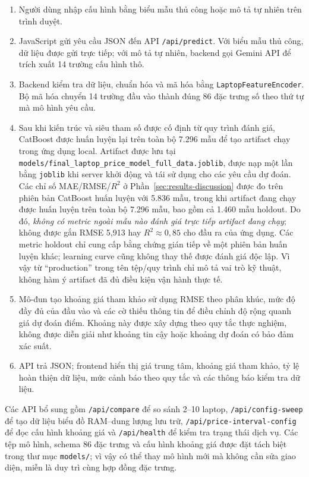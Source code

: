 \begin{enumerate}[label=\arabic*.]
    \item Người dùng nhập cấu hình bằng biểu mẫu thủ công hoặc mô tả tự nhiên trên trình duyệt.
    \item JavaScript gửi yêu cầu JSON đến API \texttt{/api/predict}. Với biểu mẫu thủ công, dữ liệu được gửi trực tiếp; với mô tả tự nhiên, backend gọi Gemini API để trích xuất 14 trường cấu hình thô.
    \item Backend kiểm tra dữ liệu, chuẩn hóa và mã hóa bằng \texttt{LaptopFeatureEncoder}. Bộ mã hóa chuyển 14 trường đầu vào thành đúng 86 đặc trưng số theo thứ tự mà mô hình yêu cầu.
    \item Sau khi kiến trúc và siêu tham số được cố định từ quy trình đánh giá, CatBoost được huấn luyện lại trên toàn bộ 7.296 mẫu để tạo artifact chạy trong ứng dụng local. Artifact được lưu tại \texttt{models/final\_laptop\_price\_model\_full\_data.joblib}, được nạp một lần bằng \texttt{joblib} khi server khởi động và tái sử dụng cho các yêu cầu dự đoán. Các chỉ số MAE/RMSE/$R^2$ ở Phần~\ref{sec:results-discussion} được đo trên phiên bản CatBoost huấn luyện với 5.836 mẫu, trong khi artifact đang chạy được huấn luyện trên toàn bộ 7.296 mẫu, bao gồm cả 1.460 mẫu holdout. Do đó, \emph{không có metric ngoài mẫu nào đánh giá trực tiếp artifact đang chạy}; không được gắn RMSE 5,913 hay $R^2\approx0,85$ cho đầu ra của ứng dụng. Các metric holdout chỉ cung cấp bằng chứng gián tiếp về một phiên bản huấn luyện khác; learning curve cũng không thay thế được đánh giá độc lập. Vì vậy từ ``production'' trong tên tệp/quy trình chỉ mô tả vai trò kỹ thuật, không hàm ý artifact đã đủ điều kiện vận hành thực tế.
    \item Mô-đun tạo khoảng giá tham khảo sử dụng RMSE theo phân khúc, mức độ đầy đủ của đầu vào và các cờ thiếu thông tin để điều chỉnh độ rộng quanh giá dự đoán điểm. Khoảng này được xây dựng theo quy tắc thực nghiệm, không được diễn giải như khoảng tin cậy hoặc khoảng dự đoán có bảo đảm xác suất.
    \item API trả JSON; frontend hiển thị giá trung tâm, khoảng giá tham khảo, tỷ lệ hoàn thiện dữ liệu, mức cảnh báo theo quy tắc và các thông báo kiểm tra dữ liệu.
\end{enumerate}

Các API bổ sung gồm \texttt{/api/compare} để so sánh 2--10 laptop, \texttt{/api/config-sweep} để tạo dữ liệu biểu đồ RAM--dung lượng lưu trữ, \texttt{/api/price-interval-config} để đọc cấu hình khoảng giá và \texttt{/api/health} để kiểm tra trạng thái dịch vụ. Các tệp mô hình, schema 86 đặc trưng và cấu hình khoảng giá được đặt tách biệt trong thư mục \texttt{models/}; vì vậy có thể thay mô hình mới mà không cần sửa giao diện, miễn là duy trì cùng hợp đồng đặc trưng.

